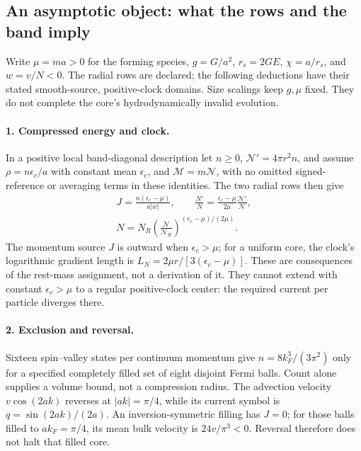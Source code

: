 \documentclass[10pt]{article}
\begin{document}
\subsection*{An asymptotic object: what the rows and the band imply}
Write \(\mu=ma>0\) for the forming species, \(g=G/a^2\),
\(r_s=2GE\), \(\chi=a/r_s\), and
\(w=v/N<0\). The radial rows are declared; the following deductions
have their stated smooth-source, positive-clock domains. Size scalings
keep \(g,\mu\) fixed. They do not complete the core's
hydrodynamically invalid evolution.

\paragraph{1. Compressed energy and clock.}
In a positive local band-diagonal description let \(n\ge0\),
\(\mathscr N'=4\pi r^2n\), and assume
\(\rho=n\epsilon_c/a\) with constant mean \(\epsilon_c\), and
\(\mathcal M=m\mathscr N\), with no
omitted signed-reference or averaging terms in these identities.
The two radial rows then give
\[
\begin{aligned}
 J=\frac{n(\epsilon_c-\mu)}{a|w|},\qquad
 \frac{N'}N=\frac{\epsilon_c-\mu}{2\mu}
              \frac{\mathscr N'}{\mathscr N},\\
 N=N_R\left(\frac{\mathscr N}{\mathscr N_R}\right)^{(\epsilon_c-\mu)/(2\mu)}.
\end{aligned}
\]
The momentum source \(J\) is outward when \(\epsilon_c>\mu\); for a uniform core,
the clock's logarithmic gradient length is
\(L_N=2\mu r/[3(\epsilon_c-\mu)]\). These are consequences of the
rest-mass assignment, not a derivation of it. They cannot extend with
constant \(\epsilon_c>\mu\) to a regular positive-clock center:
the required current per particle diverges there.

\paragraph{2. Exclusion and reversal.}
Sixteen spin--valley states per continuum momentum give
\(n=8k_F^3/(3\pi^2)\) only for a specified completely filled set of
eight disjoint Fermi balls. Count alone supplies a volume bound, not
a compression radius. The advection velocity \(v\cos(2ak)\) reverses
at \(|ak|=\pi/4\), while its current symbol is
\(q=\sin(2ak)/(2a)\). An inversion-symmetric filling has \(J=0\);
for those balls filled to \(ak_F=\pi/4\), its mean bulk velocity
is \(24v/\pi^3<0\). Reversal therefore does not halt that filled core.
\end{document}
